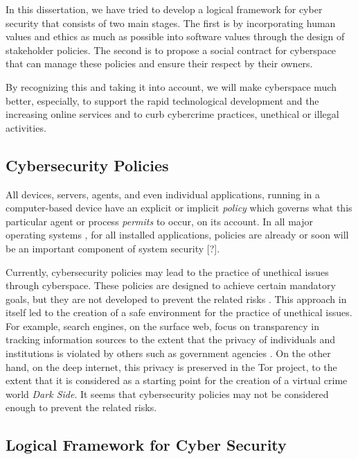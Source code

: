 \if In this dissertation, we have tried to develop a logical framework for cyber security that consists of two main stages. The first is by incorporating  human values and ethics as much as possible into software values through the design of stakeholder policies. The second is to propose a social contract for cyberspace that can manage these policies and ensure their respect by their owners.


By recognizing this and taking it into account, we will make cyberspace much better, especially,  to support the rapid technological development and the increasing online services and to curb cybercrime practices, unethical or illegal activities.
\fi
\subsection{Cybersecurity Policies}
All devices, servers, agents, and even individual applications, running in a computer-based device have an explicit or implicit {\em policy} which governs what this particular agent or process {\em permits} to occur, on its account. In all major operating systems , for all installed applications, policies are already or soon will be an important component of system security [?].

Currently, cybersecurity policies may lead to the practice of unethical issues through cyberspace. These policies are designed to achieve certain mandatory goals, but they are not developed to prevent the related risks \cite{gupta2021dark,kavallieros2021understanding}. This approach in itself led to the creation of a safe environment for the practice of unethical issues.
For example, search engines, on the surface web, focus on transparency in tracking information sources to the extent that the privacy of individuals and institutions is violated by others such as government agencies . On the other hand, on the deep internet, this privacy is preserved in the Tor project, to the extent that it is considered as a starting point for the creation of a virtual crime world
\emph{Dark Side}. It seems that cybersecurity policies may not be considered enough to prevent the related risks.

\subsection{Logical Framework for Cyber Security}


